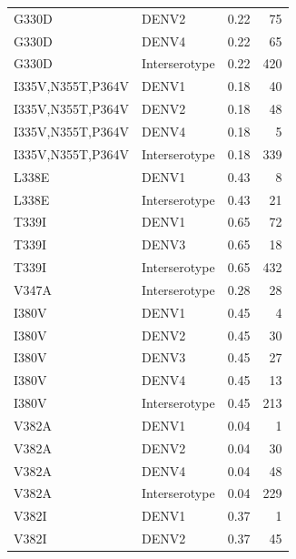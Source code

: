 \documentclass[11pt,oneside,letterpaper]{article}
\begin{document}
\begin{centering}
\begin{table}[ht]
{\begin{tabular}{llrr}
                           G330D &          DENV2 &  0.22 &     75 \\
                           G330D &          DENV4 &  0.22 &     65 \\
                           G330D &  Interserotype &  0.22 &    420 \\
               I335V,N355T,P364V &          DENV1 &  0.18 &     40 \\
               I335V,N355T,P364V &          DENV2 &  0.18 &     48 \\
               I335V,N355T,P364V &          DENV4 &  0.18 &      5 \\
               I335V,N355T,P364V &  Interserotype &  0.18 &    339 \\
                           L338E &          DENV1 &  0.43 &      8 \\
                           L338E &  Interserotype &  0.43 &     21 \\
                           T339I &          DENV1 &  0.65 &     72 \\
                           T339I &          DENV3 &  0.65 &     18 \\
                           T339I &  Interserotype &  0.65 &    432 \\
                           V347A &  Interserotype &  0.28 &     28 \\
                           I380V &          DENV1 &  0.45 &      4 \\
                           I380V &          DENV2 &  0.45 &     30 \\
                           I380V &          DENV3 &  0.45 &     27 \\
                           I380V &          DENV4 &  0.45 &     13 \\
                           I380V &  Interserotype &  0.45 &    213 \\
                           V382A &          DENV1 &  0.04 &      1 \\
                           V382A &          DENV2 &  0.04 &     30 \\
                           V382A &          DENV4 &  0.04 &     48 \\
                           V382A &  Interserotype &  0.04 &    229 \\
                           V382I &          DENV1 &  0.37 &      1 \\
                           V382I &          DENV2 &  0.37 &     45 \\

\end{tabular}}
\end{table}
\end{centering}
\end{document}
